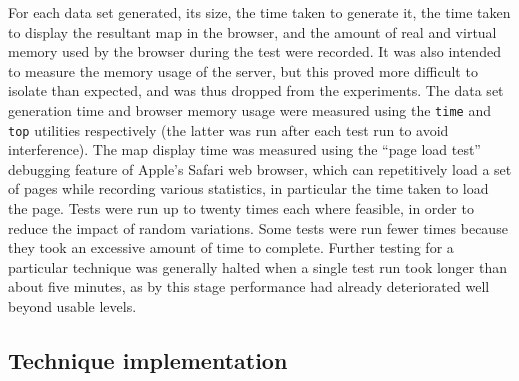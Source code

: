 \documentclass[acmnow]{acmtrans2m}
\begin{document}
For each data set generated, its size, the time taken to generate it,
the time taken to display the resultant map in the browser, and the
amount of real and virtual memory used by the browser during the test
were recorded. It was also intended to measure the memory usage of the
server, but this proved more difficult to isolate than expected, and was
thus dropped from the experiments. The data set generation time and
browser memory usage were measured using the \texttt{time} and
\texttt{top} utilities respectively (the latter was run after each test
run to avoid interference). The map display time was measured using the
``page load test'' debugging feature of Apple's Safari web browser,
which can repetitively load a set of pages while recording various
statistics, in particular the time taken to load the page. Tests were
run up to twenty times each where feasible, in order to reduce the
impact of random variations. Some tests were run fewer times because
they took an excessive amount of time to complete. Further testing for a
particular technique was generally halted when a single test run took
longer than about five minutes, as by this stage performance had already
deteriorated well beyond usable levels.


\subsection{Technique implementation}
\end{document}
